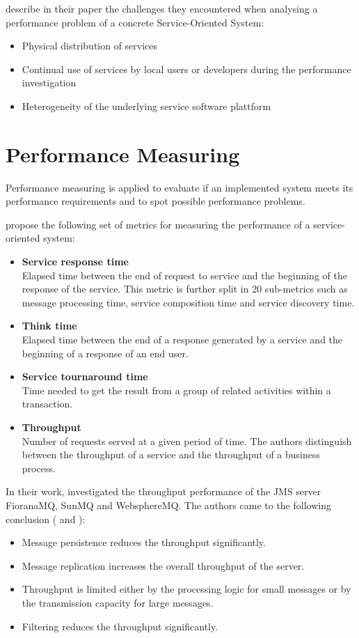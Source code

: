 \citet{Woodall:2007kx} describe in their paper the challenges they encountered when analysing a performance problem of a concrete Service-Oriented System:
\begin{itemize}
	\item Physical distribution of services
	\item Continual use of services by local users or developers during the performance investigation
	\item Heterogeneity of the underlying service software plattform
\end{itemize}

\section{Performance Measuring}
Performance measuring is applied to evaluate if an implemented system meets its performance requirements and to spot possible performance problems.

\citet{Her:2007qf} propose the following set of metrics for measuring the performance of a service-oriented system:
\begin{itemize}
	\item \textbf{Service response time}\\
	Elapsed time between the end of request to service and the beginning of the response of the service. This metric is further split in 20 sub-metrics such as message processing time, service composition time and service discovery time.
	\item \textbf{Think time}\\
	Elapsed time between the end of a response generated by a service and the beginning of a response of an end user.
	\item \textbf{Service tournaround time}\\
	Time needed to get the result from a group of related activities within a transaction.
	\item \textbf{Throughput}\\
	Number of requests served at a given period of time. The authors distinguish between the throughput of a service and the throughput of a business process.
\end{itemize}

In their work, \citeauthor{Henjes:2006nx} investigated the throughput performance of the JMS server FioranaMQ, SunMQ and WebsphereMQ. The authors came to the following conclusion (\citet{Henjes:2006nx} and \citet{Menth:2006qe}):
\begin{itemize}
	\item Message persistence reduces the throughput significantly.
	\item Message replication increases the overall throughput of the server.
	\item Throughput is limited either by the processing logic for small messages or by the transmission capacity for large messages.
	\item Filtering reduces the throughput significantly.
\end{itemize}

